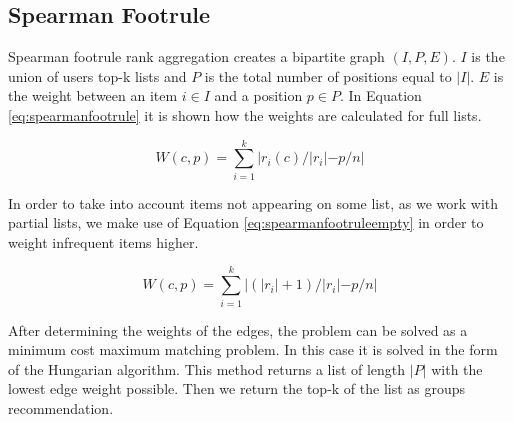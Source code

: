 \subsection{Spearman Footrule}\label{sec:spearmanfootrule}
Spearman footrule rank aggregation creates a bipartite graph $(I,P,E)$. 
$I$ is the union of users top-k lists and $P$ is the total number of positions equal to $|I|$. $E$ is the weight between an item $i \in I$ and a position $p \in P$. In Equation \ref{eq:spearmanfootrule} it is shown how the weights are calculated for full lists. 


\begin{equation}\label{eq:spearmanfootrule}
W(c,p) = \displaystyle\sum_{i=1}^{k} |r_i(c)/|r_i| - p/n|
\end{equation}

In order to take into account items not appearing on some list, as we work with partial lists, we make use of Equation \ref{eq:spearmanfootruleempty} in order to weight infrequent items higher.

\begin{equation}\label{eq:spearmanfootruleempty}
W(c,p) = \displaystyle\sum_{i=1}^{k} |(|r_i| + 1)/|r_i| - p/n|
\end{equation}

After determining the weights of the edges, the problem can be solved as a minimum cost maximum matching problem. In this case it is solved in the form of the Hungarian algorithm. This method returns a list of length $|P|$ with the lowest edge weight possible. Then we return the top-k of the list as groups recommendation.
